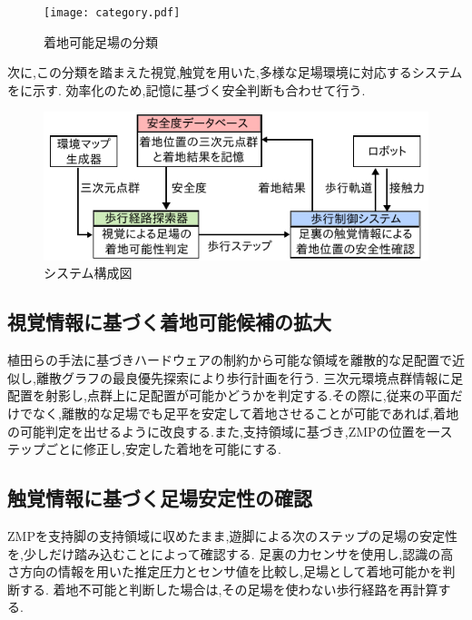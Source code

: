 \documentclass[twocolumn]{preport}
\begin{document}
\begin{figure}[tbh]
 \begin{center}
   \centering
   \texttt{[image: category.pdf]}
   \caption{着地可能足場の分類}
   \label{figure:category}
 \end{center}
\end{figure}

次に,この分類を踏まえた視覚,触覚を用いた,多様な足場環境に対応するシステムをに示す.
効率化のため,記憶に基づく安全判断も合わせて行う.

\begin{figure}[tbh]
 \begin{center}
   \centering
   \includegraphics[width=\columnwidth]{system_fig.pdf}
   \caption{システム構成図}
   \label{figure:system}
 \end{center}
\end{figure}

\subsection{視覚情報に基づく着地可能候補の拡大}
植田ら\cite{ueda2015dron}の手法に基づきハードウェアの制約から可能な領域を離散的な足配置で近似し,離散グラフの最良優先探索により歩行計画を行う.
三次元環境点群情報に足配置を射影し,点群上に足配置が可能かどうかを判定する.その際に,従来の平面だけでなく,離散的な足場でも足平を安定して着地させることが可能であれば,着地の可能判定を出せるように改良する.また,支持領域に基づき,ZMPの位置を一ステップごとに修正し,安定した着地を可能にする.

\subsection{触覚情報に基づく足場安定性の確認}
ZMPを支持脚の支持領域に収めたまま,遊脚による次のステップの足場の安定性を,少しだけ踏み込むことによって確認する.
足裏の力センサを使用し,認識の高さ方向の情報を用いた推定圧力とセンサ値を比較し,足場として着地可能かを判断する.
着地不可能と判断した場合は,その足場を使わない歩行経路を再計算する.
\end{document}
